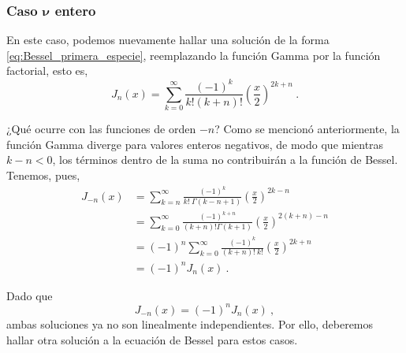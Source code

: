 \subsubsection{Caso $\boldsymbol{\nu}$ entero}

En este caso, podemos nuevamente hallar una solución de la forma \eqref{eq:Bessel_primera_especie}, reemplazando la función Gamma por la función factorial, esto es,
\begin{equation}
    J_n(x) = \sum_{k=0}^\infty \frac{(-1)^k}{k! (k+n)!} \left( \frac{x}{2} \right)^{2k+n} \ .
\end{equation}

¿Qué ocurre con las funciones de orden $-n$? Como se mencionó anteriormente, la función Gamma diverge para valores enteros negativos, de modo que mientras $k-n < 0$, los términos dentro de la suma no contribuirán a la función de Bessel. Tenemos, pues,
\begin{align}
    J_{-n}(x) & = \sum_{k = n}^\infty \frac{(-1)^k}{k! \ \Gamma(k-n+1)} \left( \frac{x}{2} \right)^{2k-n} \\
    & = \sum_{k=0}^\infty \frac{(-1)^{k+n}}{(k+n)! \Gamma(k+1)} \left( \frac{x}{2} \right)^{2(k+n)-n} \\
    & = (-1)^n \sum_{k=0}^\infty \frac{(-1)^k}{(k+n)! \ k!} \left( \frac{x}{2} \right)^{2k+n} \\
    & = (-1)^n J_n(x) \ . 
\end{align}

Dado que
\begin{equation}
    J_{-n}(x) = (-1)^n J_n(x) \ ,
\end{equation}
ambas soluciones ya no son linealmente independientes. Por ello, deberemos hallar otra solución a la ecuación de Bessel para estos casos.

